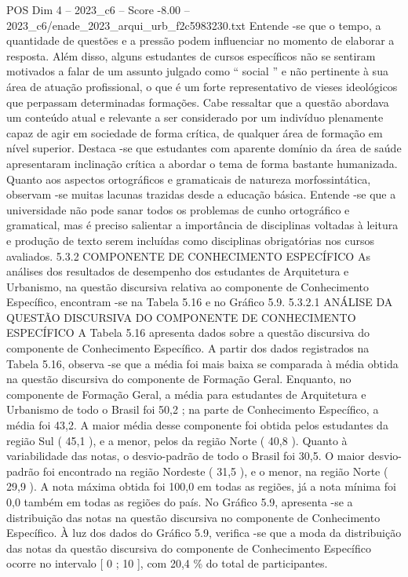 \begin{textsample}{POS Dim 4 – 2023\_c6 – Score -8.00 – 2023\_c6/enade\_2023\_arqui\_urb\_f2c5983230.txt}
Entende -se que o tempo, a quantidade de questões e a pressão podem influenciar no momento de elaborar a resposta.
Além disso, alguns estudantes de cursos específicos não se sentiram motivados a falar de um assunto julgado como “ social ” e não pertinente à sua área de atuação profissional, o que é um forte representativo de vieses ideológicos que perpassam determinadas formações.
Cabe ressaltar que a questão abordava um conteúdo atual e relevante a ser considerado por um indivíduo plenamente capaz de agir em sociedade de forma crítica, de qualquer área de formação em nível superior.
Destaca -se que estudantes com aparente domínio da área de saúde apresentaram inclinação crítica a abordar o tema de forma bastante humanizada.
Quanto aos aspectos ortográficos e gramaticais de natureza morfossintática, observam -se muitas lacunas trazidas desde a educação básica.
Entende -se que a universidade não pode sanar todos os problemas de cunho ortográfico e gramatical, mas é preciso salientar a importância de disciplinas voltadas à leitura e produção de texto serem incluídas como disciplinas obrigatórias nos cursos avaliados. 5.3.2 COMPONENTE DE CONHECIMENTO ESPECÍFICO As análises dos resultados de desempenho dos estudantes de Arquitetura e Urbanismo, na questão discursiva relativa ao componente de Conhecimento Específico, encontram -se na Tabela 5.16 e no Gráfico 5.9. 5.3.2.1 ANÁLISE DA QUESTÃO DISCURSIVA DO COMPONENTE DE CONHECIMENTO ESPECÍFICO A Tabela 5.16 apresenta dados sobre a questão discursiva do componente de Conhecimento Específico.
A partir dos dados registrados na Tabela 5.16, observa -se que a média foi mais baixa se comparada à média obtida na questão discursiva do componente de Formação Geral.
Enquanto, no componente de Formação Geral, a média para estudantes de Arquitetura e Urbanismo de todo o Brasil foi 50,2 ; na parte de Conhecimento Específico, a média foi 43,2.
A maior média desse componente foi obtida pelos estudantes da região Sul ( 45,1 ), e a menor, pelos da região Norte ( 40,8 ).
Quanto à variabilidade das notas, o desvio-padrão de todo o Brasil foi 30,5.
O maior desvio-padrão foi encontrado na região Nordeste ( 31,5 ), e o menor, na região Norte ( 29,9 ).
A nota máxima obtida foi 100,0 em todas as regiões, já a nota mínima foi 0,0 também em todas as regiões do país.
No Gráfico 5.9, apresenta -se a distribuição das notas na questão discursiva no componente de Conhecimento Específico.
À luz dos dados do Gráfico 5.9, verifica -se que a moda da distribuição das notas da questão discursiva do componente de Conhecimento Específico ocorre no intervalo [ 0 ; 10 ], com 20,4 \% do total de participantes.

\end{textsample}
